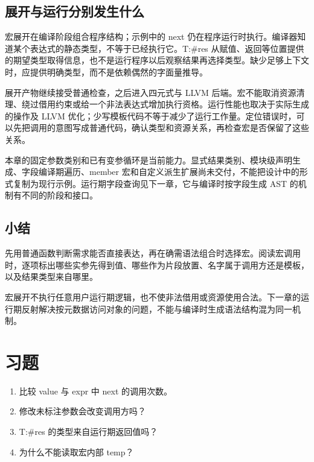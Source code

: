 \subsection*{展开与运行分别发生什么}

宏展开在编译阶段组合程序结构；示例中的 next 仍在程序运行时执行。编译器知道某个表达式的静态类型，不等于已经执行它。T:\#res 从赋值、返回等位置提供的期望类型取得信息，也不是运行程序以后观察结果再选择类型。缺少足够上下文时，应提供明确类型，而不是依赖偶然的字面量推导。

展开产物继续接受普通检查，之后进入四元式与 LLVM 后端。宏不能取消资源清理、绕过借用约束或给一个非法表达式增加执行资格。运行性能也取决于实际生成的操作及 LLVM 优化；少写模板代码不等于减少了运行工作量。定位错误时，可以先把调用的意图写成普通代码，确认类型和资源关系，再检查宏是否保留了这些关系。

本章的固定参数类别和已有变参循环是当前能力。显式结果类别、模块级声明生成、字段编译期遍历、member 宏和自定义派生扩展尚未交付，不能把设计中的形式复制为现行示例。运行期字段查询见下一章，它与编译时按字段生成 AST 的机制有不同的阶段和接口。

\subsection*{小结}

先用普通函数判断需求能否直接表达，再在确需语法组合时选择宏。阅读宏调用时，逐项标出哪些实参先得到值、哪些作为片段放置、名字属于调用方还是模板，以及结果类型来自哪里。

宏展开不执行任意用户运行期逻辑，也不使非法借用或资源使用合法。下一章的运行期反射解决按元数据访问对象的问题，不能与编译时生成语法结构混为同一机制。

\section{习题}

\begin{enumerate}

\item 比较 value 与 expr 中 next 的调用次数。

\item 修改未标注参数会改变调用方吗？

\item T:\#res 的类型来自运行期返回值吗？

\item 为什么不能读取宏内部 temp？

\end{enumerate}

